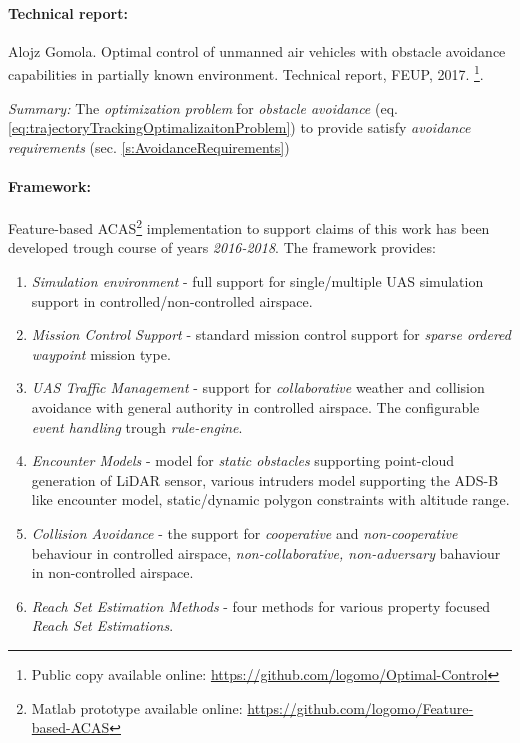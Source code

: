 \paragraph{Technical report:} Alojz  Gomola.   Optimal  control  of  unmanned  air  vehicles  with  obstacle  avoidance capabilities in partially known environment.  Technical report, FEUP, 2017. \cite{gomola2017optimal}\footnote{Public copy available online: \url{https://github.com/logomo/Optimal-Control}}.

\emph{Summary:} The \emph{optimization problem} for \emph{obstacle avoidance} (eq. \ref{eq:trajectoryTrackingOptimalizaitonProblem}) to provide satisfy  \emph{avoidance requirements} (sec. \ref{s:AvoidanceRequirements}) 

\paragraph{Framework:} Feature-based ACAS\footnote{Matlab prototype available online: \url{https://github.com/logomo/Feature-based-ACAS}} implementation to support claims of this work has been developed trough course of years \emph{2016-2018}. The framework provides: 
\begin{enumerate}
    \item \emph{Simulation environment} - full support for single/multiple UAS simulation support in controlled/non-controlled airspace.
    
    \item \emph{Mission Control Support} - standard mission control support for \emph{sparse ordered waypoint} mission type. 
    
    \item \emph{UAS Traffic Management} - support for \emph{collaborative} weather and collision avoidance with general authority in controlled airspace. The configurable \emph{event handling} trough \emph{rule-engine}.
    
    \item \emph{Encounter Models} - model for \emph{static obstacles} supporting point-cloud generation of LiDAR sensor, various intruders model supporting the ADS-B like encounter model, static/dynamic polygon constraints with altitude range. 
    
    \item \emph{Collision Avoidance} - the support for \emph{cooperative} and \emph{non-cooperative} behaviour in controlled airspace, \emph{non-collaborative, non-adversary} bahaviour in non-controlled airspace. 
    
    \item \emph{Reach Set Estimation Methods} - four methods for various property focused \emph{Reach Set Estimations}.
\end{enumerate}